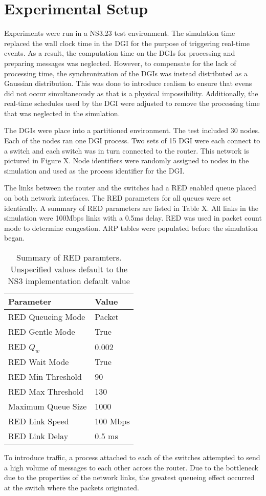 
\section{Experimental Setup}

Experiments were run in a NS3.23 test environment.
The simulation time replaced the wall clock time in the DGI for the purpose of triggering real-time events.
As a result, the computation time on the DGIs for processing and preparing messages was neglected.
However, to compensate for the lack of processing time, the synchronization of the DGIs was instead distributed as a Gaussian distribution.
This was done to introduce realism to ensure that evens did not occur simultaneously as that is a physical impossibility.
Additionally, the real-time schedules used by the DGI were adjusted to remove the processing time that was neglected in the simulation.

The DGIs were place into a partitioned environment.
The test included 30 nodes.
Each of the nodes ran one DGI process.
Two sets of 15 DGI were each connect to a switch and each switch was in turn connected to the router.
This network is pictured in Figure X.
Node identifiers were randomly assigned to nodes in the simulation and used as the process identifier for the DGI.

The links between the router and the switches had a RED enabled queue placed on both network interfaces.
The RED parameters for all queues were set identically.
A summary of RED parameters are listed in Table X.
All links in the simulation were 100Mbps links with a 0.5ms delay.
RED was used in packet count mode to determine congestion.
ARP tables were populated before the simulation began.

\begin{table*}
\begin{tabular}{ | l | l | } \hline
Parameter & Value         \\ \hline
RED Queueing Mode & Packet\\ \hline 
RED Gentle Mode & True    \\ \hline
RED $Q_{w}$ & 0.002       \\ \hline
RED Wait Mode & True      \\ \hline
RED Min Threshold & 90    \\ \hline
RED Max Threshold & 130   \\ \hline
Maximum Queue Size & 1000 \\ \hline
RED Link Speed & 100 Mbps \\ \hline
RED Link Delay & 0.5 ms   \\ \hline
\end{tabular}
\caption{Summary of RED paramters. Unspecified values default to the NS3 implementation default value}
\label{tab:red-parameters}
\end{table*}

To introduce traffic, a process attached to each of the switches attempted to send a high volume of messages to each other across the router.
Due to the bottleneck due to the properties of the network links, the greatest queueing effect occurred at the switch where the packets originated.

